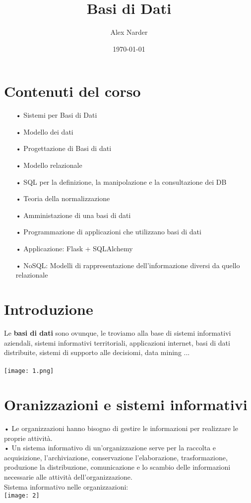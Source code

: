 \documentclass[12pt, letterpaper]{article}
\title{Basi di Dati}
\author{Alex Narder}
\date{\today}
\begin{document}
\maketitle

\section{Contenuti del corso}
\begin{itemize}
   \item[•] Sistemi per Basi di Dati
   \item[•] Modello dei dati
   \item[•] Progettazione di Basi di dati
   \item[•] Modello relazionale
   \item[•] SQL per la definizione, la manipolazione e la consultazione dei DB
   \item[•] Teoria della normalizzazione
   \item[•] Amministazione di una basi di dati
   \item[•] Programmazione di applicazioni che utilizzano basi di dati
   \item[•] Applicazione: Flask + SQLAlchemy
   \item[•] NoSQL: Modelli di rappresentazione dell’informazione diversi da quello relazionale
\end{itemize}
\newpage

\section{Introduzione}

Le \textbf{basi di dati} sono ovunque, le troviamo alla base di sistemi informativi aziendali, sistemi informativi territoriali,
applicazioni internet, basi di dati distribuite, sistemi di supporto alle decisiomi, data mining ...
\\
\\
\texttt{[image: 1.png]}

\section{Oranizzazioni e sistemi informativi}

• Le organizzazioni hanno bisogno di gestire le informazioni per realizzare le proprie attività.
\\
• Un sistema informativo di un'organizzazione serve per la raccolta e acquisizione, l’archiviazione, conservazione l’elaborazione, trasformazione, produzione la distribuzione, comunicazione e lo scambio delle informazioni necessarie alle attività dell’organizzazione.
\\
Sistema informativo nelle organizzazioni:\\
\texttt{[image: 2]}
\newpage
\end{document}
